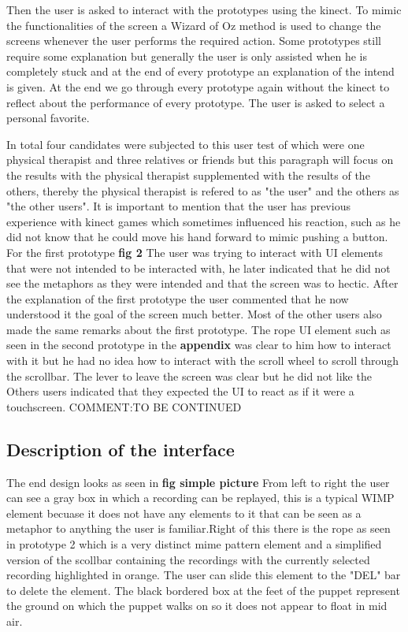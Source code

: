 Then the user is asked to interact with the prototypes using the kinect. To mimic the functionalities of the screen a Wizard of Oz method is used to change the screens whenever the user performs the required action. Some prototypes still require some explanation but generally the user is only assisted when he is completely stuck and at the end of every prototype an explanation of the intend is given. At the end we go through every prototype again without the kinect to reflect about the performance of every prototype. The user is asked to select a personal favorite.

In total four candidates were subjected to this user test of which were one physical therapist and three relatives or friends but this paragraph will focus on the results with the physical therapist supplemented with the results of the others, thereby the physical therapist is refered to as "the user" and the others as "the other users". It is important to mention that the user has previous experience with kinect games which sometimes influenced his reaction, such as he did not know that he could move his hand forward to mimic pushing a button. For the first prototype  \textbf{ fig 2} The user was trying to interact with UI elements that were not intended to be interacted with, he later indicated that he did not see the metaphors as they were intended and that the screen was to hectic. After the explanation of the first prototype the user commented that he now understood it the goal of the screen much better. Most of the other users also made the same remarks about the first prototype. The rope UI element such as seen in the second prototype in the \textbf{ appendix} was clear to him how to interact with it but he had no idea how to interact with the scroll wheel to scroll through the scrollbar. The lever to leave the screen was clear but he did not like the Others users indicated that they expected the UI to react as if it were a touchscreen. 
{\large COMMENT:TO BE CONTINUED}









\subsection{Description of the interface}

The end design looks as seen in \textbf{ fig simple picture} From left to right the user can see a gray box in which a recording can be replayed, this is a typical WIMP element becuase it does not have any elements to it that can be seen as a metaphor to anything the user is familiar.Right of this there is the rope as seen in prototype 2 which is a very distinct mime pattern element and a simplified version of the scollbar containing the recordings with the currently selected recording highlighted in orange. The user can slide this element to the "DEL" bar to delete the element. The black bordered box at the feet of the puppet represent the ground on which the puppet walks on so it does not appear to float in mid air.

